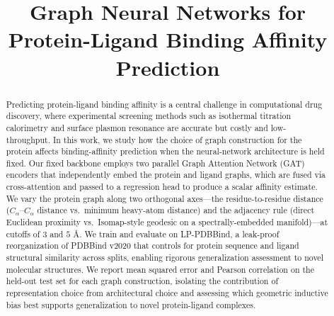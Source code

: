 \documentclass[conference]{IEEEtran}
\begin{document}
\title{Graph Neural Networks for Protein-Ligand Binding Affinity Prediction\\}

\author{
\and
{}
}

\maketitle

\begin{abstract}
Predicting protein-ligand binding affinity is a central challenge in computational drug discovery, where experimental screening methods such as isothermal titration calorimetry and surface plasmon resonance are accurate but costly and low-throughput. In this work, we study how the choice of graph construction for the protein affects binding-affinity prediction when the neural-network architecture is held fixed. Our fixed backbone employs two parallel Graph Attention Network (GAT) encoders that independently embed the protein and ligand graphs, which are fused via cross-attention and passed to a regression head to produce a scalar affinity estimate. We vary the protein graph along two orthogonal axes---the residue-to-residue distance ($C_\alpha$--$C_\alpha$ distance vs.\ minimum heavy-atom distance) and the adjacency rule (direct Euclidean proximity vs.\ Isomap-style geodesic on a spectrally-embedded manifold)---at cutoffs of $3$ and $5$ \AA. We train and evaluate on LP-PDBBind, a leak-proof reorganization of PDBBind v2020 that controls for protein sequence and ligand structural similarity across splits, enabling rigorous generalization assessment to novel molecular structures. We report mean squared error and Pearson correlation on the held-out test set for each graph construction, isolating the contribution of representation choice from architectural choice and assessing which geometric inductive bias best supports generalization to novel protein-ligand complexes.
\end{abstract}
\end{document}

